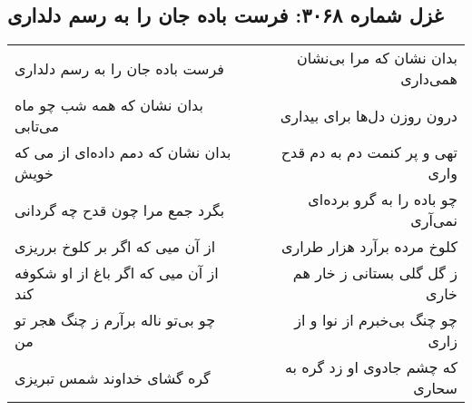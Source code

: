 \begin{center}
\section*{غزل شماره ۳۰۶۸: فرست باده جان را به رسم دلداری}
\label{sec:3068}
\begin{longtable}{l p{0.5cm} r}
فرست باده جان را به رسم دلداری
&&
بدان نشان که مرا بی‌نشان همی‌داری
\\
بدان نشان که همه شب چو ماه می‌تابی
&&
درون روزن دل‌ها برای بیداری
\\
بدان نشان که دمم داده‌ای از می که خویش
&&
تهی و پر کنمت دم به دم قدح واری
\\
بگرد جمع مرا چون قدح چه گردانی
&&
چو باده را به گرو برده‌ای نمی‌آری
\\
از آن میی که اگر بر کلوخ برریزی
&&
کلوخ مرده برآرد هزار طراری
\\
از آن میی که اگر باغ از او شکوفه کند
&&
ز گل گلی بستانی ز خار هم خاری
\\
چو بی‌تو ناله برآرم ز چنگ هجر تو من
&&
چو چنگ بی‌خبرم از نوا و از زاری
\\
گره گشای خداوند شمس تبریزی
&&
که چشم جادوی او زد گره به سحاری
\\
\end{longtable}
\end{center}

